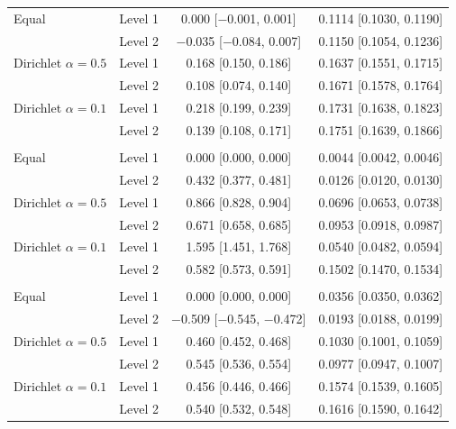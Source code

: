 \begin{tabular}{llcc}
Equal & Level 1 & 0.000 [$-$0.001, 0.001] & 0.1114 [0.1030, 0.1190] \\
 & Level 2 & $-$0.035 [$-$0.084, 0.007] & 0.1150 [0.1054, 0.1236] \\
Dirichlet $\alpha=0.5$ & Level 1 & 0.168 [0.150, 0.186] & 0.1637 [0.1551, 0.1715] \\
 & Level 2 & 0.108 [0.074, 0.140] & 0.1671 [0.1578, 0.1764] \\
Dirichlet $\alpha=0.1$ & Level 1 & 0.218 [0.199, 0.239] & 0.1731 [0.1638, 0.1823] \\
 & Level 2 & 0.139 [0.108, 0.171] & 0.1751 [0.1639, 0.1866] \\
\addlinespace
\multicolumn{4}{@{}l}{\textit{Heart, Random Forest}} \\
Equal & Level 1 & 0.000 [0.000, 0.000] & 0.0044 [0.0042, 0.0046] \\
 & Level 2 & 0.432 [0.377, 0.481] & 0.0126 [0.0120, 0.0130] \\
Dirichlet $\alpha=0.5$ & Level 1 & 0.866 [0.828, 0.904] & 0.0696 [0.0653, 0.0738] \\
 & Level 2 & 0.671 [0.658, 0.685] & 0.0953 [0.0918, 0.0987] \\
Dirichlet $\alpha=0.1$ & Level 1 & 1.595 [1.451, 1.768] & 0.0540 [0.0482, 0.0594] \\
 & Level 2 & 0.582 [0.573, 0.591] & 0.1502 [0.1470, 0.1534] \\
\addlinespace
\multicolumn{4}{@{}l}{\textit{Heart, XGBoost}} \\
Equal & Level 1 & 0.000 [0.000, 0.000] & 0.0356 [0.0350, 0.0362] \\
 & Level 2 & $-$0.509 [$-$0.545, $-$0.472] & 0.0193 [0.0188, 0.0199] \\
Dirichlet $\alpha=0.5$ & Level 1 & 0.460 [0.452, 0.468] & 0.1030 [0.1001, 0.1059] \\
 & Level 2 & 0.545 [0.536, 0.554] & 0.0977 [0.0947, 0.1007] \\
Dirichlet $\alpha=0.1$ & Level 1 & 0.456 [0.446, 0.466] & 0.1574 [0.1539, 0.1605] \\
 & Level 2 & 0.540 [0.532, 0.548] & 0.1616 [0.1590, 0.1642] \\
\bottomrule
\end{tabular}
